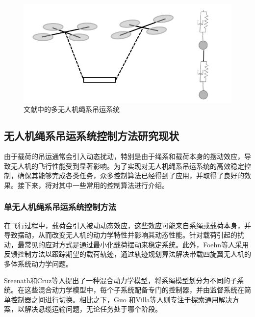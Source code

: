 \documentclass[lang=chs, degree=master, blindreview=false, winfonts=true]{yanputhesis}
\begin{document}
\begin{figure}[hbt!]
	\centering
	\includegraphics[width=28pc]{picture/1_8.png} 
	\caption{文献中的多无人机绳系吊运系统} \label{1_8}
\end{figure}

\subsection{无人机绳系吊运系统控制方法研究现状}
由于载荷的吊运通常会引入动态扰动，特别是由于绳系和载荷本身的摆动效应，导致无人机的飞行性能受到显著影响。为了实现对无人机绳系吊运系统的高效稳定控制，确保其能够完成各类任务，众多控制算法已经得到了应用，并取得了良好的效果。接下来，将对其中一些常用的控制算法进行介绍。
\subsubsection{单无人机绳系吊运系统控制方法}
在飞行过程中，载荷会引入被动动态效应，这些效应可能来自系绳或载荷本身，并导致摆动，从而改变无人机的动力学特性并影响其动态性能。针对载荷引起的扰动，最常见的应对方式是通过最小化载荷摆动来稳定系统\cite{lv2022finite,2019An}。此外，Foehn等人\cite{Foehn-RSS-17}采用反馈控制方法以跟踪期望的载荷轨迹，通过轨迹规划算法解决带载四旋翼无人机的多体系统动力学问题。

Sreenath和Cruz等人\cite{sreenath2013trajectory,cruz2015lift}提出了一种混合动力学模型，将系绳模型划分为不同的子系统。在这些混合动力学模型中，每个子系统配备专门的控制器，并由监督系统在简单控制器之间进行切换。相比之下，Guo 和Villa等人\cite{guo2020multiple,villa2021cooperative}则专注于探索通用解决方案，以解决悬缆运输问题，无论任务处于哪个阶段。
\end{document}

